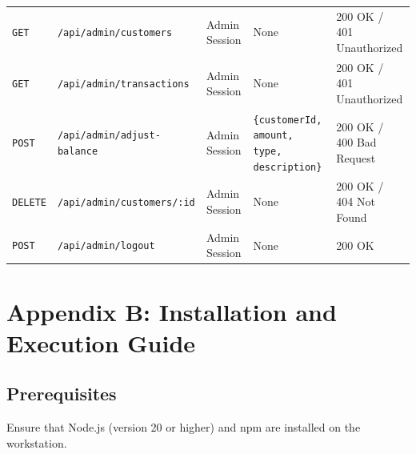 \begin{table}[htbp]
{\begin{tabular}{@{}lllll@{}}
\texttt{GET} & \texttt{/api/admin/customers} & Admin Session & None & 200 OK / 401 Unauthorized \\
\texttt{GET} & \texttt{/api/admin/transactions} & Admin Session & None & 200 OK / 401 Unauthorized \\
\texttt{POST} & \texttt{/api/admin/adjust-balance}& Admin Session & \texttt{\{customerId, amount, type, description\}} & 200 OK / 400 Bad Request \\
\texttt{DELETE} & \texttt{/api/admin/customers/:id} & Admin Session & None & 200 OK / 404 Not Found \\
\texttt{POST} & \texttt{/api/admin/logout} & Admin Session & None & 200 OK \\ \bottomrule
\end{tabular}%
}
\end{table}

\section*{Appendix B: Installation and Execution Guide}

\subsection*{Prerequisites}
Ensure that Node.js (version 20 or higher) and npm are installed on the workstation.

